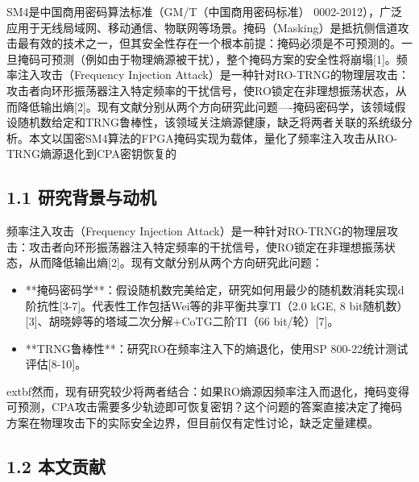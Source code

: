\documentclass[journal]{IEEEtran}
\begin{document}
SM4是中国商用密码算法标准（GM/T（中国商用密码标准） 0002-2012），广泛应用于无线局域网、移动通信、物联网等场景。掩码（Masking）是抵抗侧信道攻击最有效的技术之一，但其安全性存在一个根本前提：掩码必须是不可预测的。一旦掩码可预测（例如由于物理熵源被干扰），整个掩码方案的安全性将崩塌[1]。频率注入攻击（Frequency Injection Attack）是一种针对RO-TRNG的物理层攻击：攻击者向环形振荡器注入特定频率的干扰信号，使RO锁定在非理想振荡状态，从而降低输出熵[2]。现有文献分别从两个方向研究此问题----掩码密码学，该领域假设随机数给定和TRNG鲁棒性，该领域关注熵源健康，缺乏将两者关联的系统级分析。本文以国密SM4算法的FPGA掩码实现为载体，量化了频率注入攻击从RO-TRNG熵源退化到CPA密钥恢复的

\subsection{1.1 研究背景与动机}

频率注入攻击（Frequency Injection Attack）是一种针对RO-TRNG的物理层攻击：攻击者向环形振荡器注入特定频率的干扰信号，使RO锁定在非理想振荡状态，从而降低输出熵[2]。现有文献分别从两个方向研究此问题：
\begin{itemize}
\item **掩码密码学**：假设随机数完美给定，研究如何用最少的随机数消耗实现d阶抗性[3-7]。代表性工作包括Wei等的非平衡共享TI（2.0 kGE, 8 bit随机数）[3]、胡晓婷等的塔域二次分解+CoTG二阶TI（66 bit/轮）[7]。
\item **TRNG鲁棒性**：研究RO在频率注入下的熵退化，使用SP 800-22统计测试评估[8-10]。
\end{itemize}

	extbf{然而，现有研究较少将两者结合}：如果RO熵源因频率注入而退化，掩码变得可预测，CPA攻击需要多少轨迹即可恢复密钥？这个问题的答案直接决定了掩码方案在物理攻击下的实际安全边界，但目前仅有定性讨论，缺乏定量建模。

\subsection{1.2 本文贡献}
\end{document}
